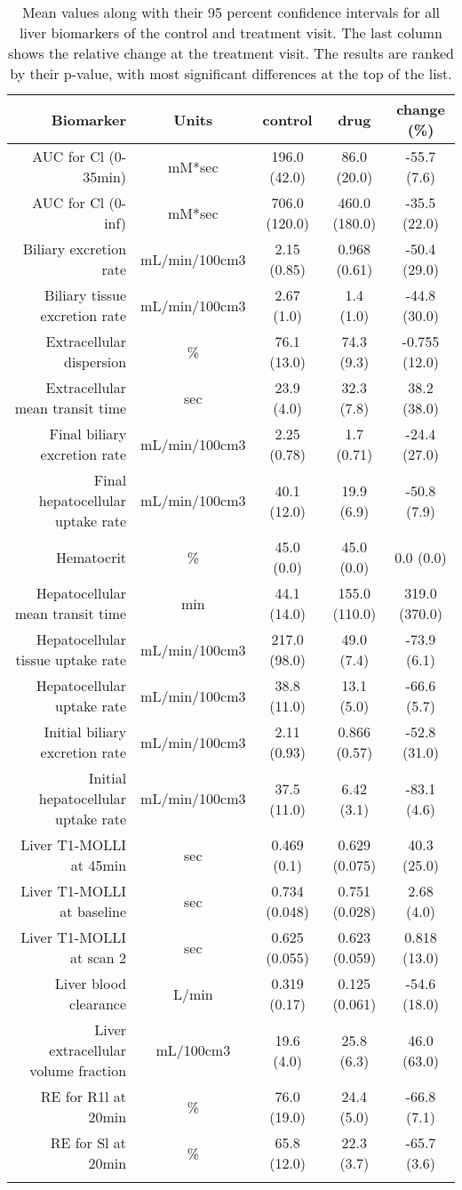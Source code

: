 \documentclass{epflreport}%
\begin{document}
\begin{longtable}{rcccc}%
\hline%
Biomarker&Units&control&drug&change (\%)\\%
\hline%
AUC for Cl (0{-}35min)&mM*sec&196.0 (42.0) &86.0 (20.0) &{-}55.7 (7.6) \\%
AUC for Cl (0{-}inf)&mM*sec&706.0 (120.0) &460.0 (180.0) &{-}35.5 (22.0) \\%
Biliary excretion rate&mL/min/100cm3&2.15 (0.85) &0.968 (0.61) &{-}50.4 (29.0) \\%
Biliary tissue excretion rate&mL/min/100cm3&2.67 (1.0) &1.4 (1.0) &{-}44.8 (30.0) \\%
Extracellular dispersion&\%&76.1 (13.0) &74.3 (9.3) &{-}0.755 (12.0) \\%
Extracellular mean transit time&sec&23.9 (4.0) &32.3 (7.8) &38.2 (38.0) \\%
Final biliary excretion rate&mL/min/100cm3&2.25 (0.78) &1.7 (0.71) &{-}24.4 (27.0) \\%
Final hepatocellular uptake rate&mL/min/100cm3&40.1 (12.0) &19.9 (6.9) &{-}50.8 (7.9) \\%
Hematocrit&\%&45.0 (0.0) &45.0 (0.0) &0.0 (0.0) \\%
Hepatocellular mean transit time&min&44.1 (14.0) &155.0 (110.0) &319.0 (370.0) \\%
Hepatocellular tissue uptake rate&mL/min/100cm3&217.0 (98.0) &49.0 (7.4) &{-}73.9 (6.1) \\%
Hepatocellular uptake rate&mL/min/100cm3&38.8 (11.0) &13.1 (5.0) &{-}66.6 (5.7) \\%
Initial biliary excretion rate&mL/min/100cm3&2.11 (0.93) &0.866 (0.57) &{-}52.8 (31.0) \\%
Initial hepatocellular uptake rate&mL/min/100cm3&37.5 (11.0) &6.42 (3.1) &{-}83.1 (4.6) \\%
Liver T1{-}MOLLI at 45min&sec&0.469 (0.1) &0.629 (0.075) &40.3 (25.0) \\%
Liver T1{-}MOLLI at baseline&sec&0.734 (0.048) &0.751 (0.028) &2.68 (4.0) \\%
Liver T1{-}MOLLI at scan 2&sec&0.625 (0.055) &0.623 (0.059) &0.818 (13.0) \\%
Liver blood clearance&L/min&0.319 (0.17) &0.125 (0.061) &{-}54.6 (18.0) \\%
Liver extracellular volume fraction&mL/100cm3&19.6 (4.0) &25.8 (6.3) &46.0 (63.0) \\%
RE for R1l at 20min&\%&76.0 (19.0) &24.4 (5.0) &{-}66.8 (7.1) \\%
RE for Sl at 20min&\%&65.8 (12.0) &22.3 (3.7) &{-}65.7 (3.6) \\%
\hline%
\caption{Mean values along with their 95 percent confidence intervals for all liver biomarkers of the control and treatment visit. The last column shows the relative change at the treatment visit. The results are ranked by their p-value, with most significant differences at the top of the list.} \\%
\end{longtable}%
\clearpage%
\end{document}
